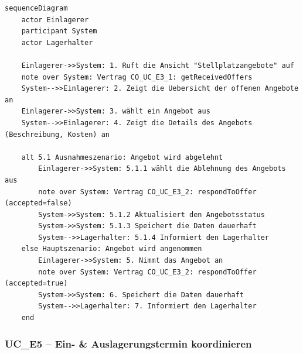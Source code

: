 \begin{lstlisting}[basicstyle=\ttfamily\small, breaklines=true]
sequenceDiagram
    actor Einlagerer
    participant System
    actor Lagerhalter

    Einlagerer->>System: 1. Ruft die Ansicht "Stellplatzangebote" auf
    note over System: Vertrag CO_UC_E3_1: getReceivedOffers
    System-->>Einlagerer: 2. Zeigt die Uebersicht der offenen Angebote an
    Einlagerer->>System: 3. wählt ein Angebot aus
    System-->>Einlagerer: 4. Zeigt die Details des Angebots (Beschreibung, Kosten) an

    alt 5.1 Ausnahmeszenario: Angebot wird abgelehnt
        Einlagerer->>System: 5.1.1 wählt die Ablehnung des Angebots aus
        note over System: Vertrag CO_UC_E3_2: respondToOffer (accepted=false)
        System->>System: 5.1.2 Aktualisiert den Angebotsstatus
        System->>System: 5.1.3 Speichert die Daten dauerhaft
        System-->>Lagerhalter: 5.1.4 Informiert den Lagerhalter
    else Hauptszenario: Angebot wird angenommen
        Einlagerer->>System: 5. Nimmt das Angebot an
        note over System: Vertrag CO_UC_E3_2: respondToOffer (accepted=true)
        System->>System: 6. Speichert die Daten dauerhaft
        System-->>Lagerhalter: 7. Informiert den Lagerhalter
    end
\end{lstlisting}

\newpage

{}
\subsubsection*{UC\_E5 – Ein- \& Auslagerungstermin koordinieren}

